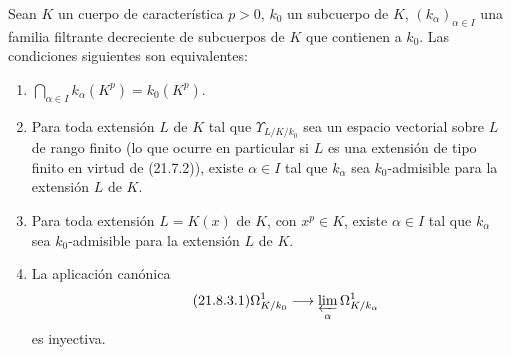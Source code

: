 \begin{theorem}[21.8.3]
\label{0.21.8.3-fr}
Sean $K$ un cuerpo de característica $p>0$, $k_0$ un subcuerpo de $K$,
$(k_\alpha)_{\alpha\in I}$ una familia filtrante decreciente de subcuerpos
de $K$ que contienen a $k_0$. Las condiciones siguientes son equivalentes:
\begin{enumerate}
  \item[\rm a)] $\bigcap_{\alpha\in I}k_\alpha(K^p)=k_0(K^p)$.
  \item[\rm b)] Para toda extensión $L$ de $K$ tal que
  $\Upsilon_{L/K/k_0}$ sea un espacio vectorial sobre $L$ de rango finito
  \textup{(}lo que ocurre en particular si $L$ es una extensión de tipo finito en
  virtud de \textup{(21.7.2))}, existe $\alpha\in I$ tal que $k_\alpha$ sea
  $k_0$-admisible para la extensión $L$ de $K$.
  \item[\rm b$'$)] Para toda extensión $L=K(x)$ de $K$, con $x^p\in K$,
  existe $\alpha\in I$ tal que $k_\alpha$ sea $k_0$-admisible para
  la extensión $L$ de $K$.
  \item[\rm c)] La aplicación canónica
\begin{equation}
\tag{21.8.3.1}
\label{0.21.8.3.1-fr}
\Omega^1_{K/k_0}\longrightarrow\varprojlim_{\alpha}\Omega^1_{K/k_\alpha}
\end{equation}
es inyectiva.
\end{enumerate}
\end{theorem}

